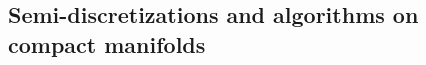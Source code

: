 \documentclass[final,leqno]{siamltex1213}
\begin{document}
%
%

\subsection{Semi-discretizations and algorithms on compact manifolds}
\end{document}
